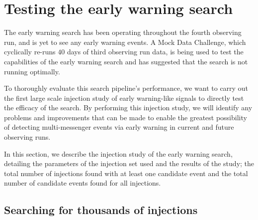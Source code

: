 \section{\label{6:sec:injection-tests}Testing the early warning search}

The early warning search has been operating throughout the fourth observing run, and is yet to see any early warning events. A Mock Data Challenge, which cyclically re-runs $40$ days of third observing run data, is being used to test the capabilities of the early warning search and has suggested that the search is not running optimally.

To thoroughly evaluate this search pipeline's performance, we want to carry out the first large scale injection study of early warning-like \gwadj signals to directly test the efficacy of the search. By performing this injection study, we will identify any problems and improvements that can be made to enable the greatest possibility of detecting multi-messenger events via early warning in current and future observing runs.

In this section, we describe the injection study of the early warning search, detailing the parameters of the injection set used and the results of the study; the total number of injections found with at least one candidate event and the total number of candidate events found for all injections.

\subsection{\label{6:sec:injection-set}Searching for thousands of \gwadj injections}

